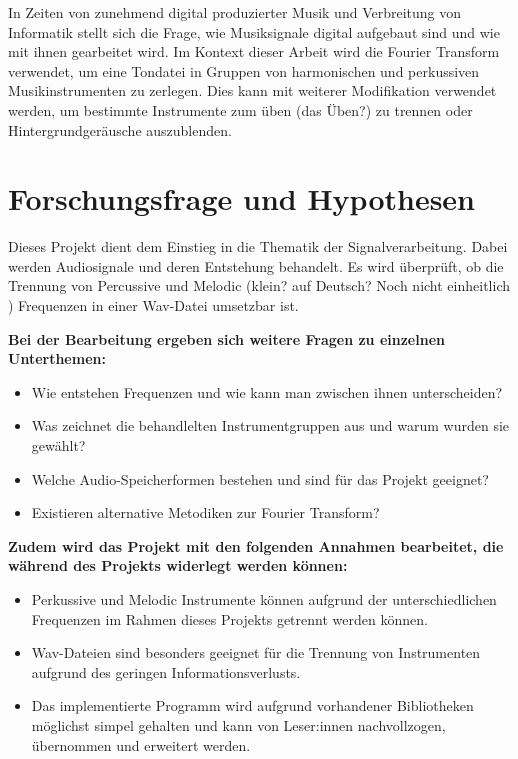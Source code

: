 \par

In Zeiten von zunehmend digital produzierter Musik und Verbreitung von Informatik stellt sich die Frage, wie Musiksignale digital aufgebaut sind und wie mit ihnen gearbeitet wird. Im Kontext dieser Arbeit wird die Fourier Transform verwendet, um eine Tondatei in Gruppen von harmonischen und perkussiven Musikinstrumenten zu zerlegen. Dies kann mit weiterer Modifikation verwendet werden, um bestimmte Instrumente zum üben (das Üben?) zu trennen oder Hintergrundgeräusche auszublenden.


%
\section{Forschungsfrage und Hypothesen}
\label{research-question-and-hypotheses}
%

Dieses Projekt dient dem Einstieg in die Thematik der Signalverarbeitung. Dabei werden Audiosignale und deren Entstehung behandelt.
Es wird überprüft, ob die Trennung von Percussive und Melodic (klein? auf Deutsch? Noch nicht einheitlich ) Frequenzen in einer Wav-Datei umsetzbar ist.

\par

\textbf{Bei der Bearbeitung ergeben sich weitere Fragen zu einzelnen Unterthemen:}

%
\begin{itemize}
    \item Wie entstehen Frequenzen und wie kann man zwischen ihnen unterscheiden?
    \item Was zeichnet die behandlelten Instrumentgruppen aus und warum wurden sie gewählt?
    \item Welche Audio-Speicherformen bestehen und sind für das Projekt geeignet?
    \item Existieren alternative Metodiken zur Fourier Transform? 
\end{itemize}
%

\textbf{Zudem wird das Projekt mit den folgenden Annahmen bearbeitet, die während des Projekts widerlegt werden können:}

%
\begin{itemize}
    \item Perkussive und Melodic Instrumente können aufgrund der unterschiedlichen Frequenzen im Rahmen dieses Projekts getrennt werden können.
    \item Wav-Dateien sind besonders geeignet für die Trennung von Instrumenten aufgrund des geringen Informationsverlusts.
    \item Das implementierte Programm wird aufgrund vorhandener Bibliotheken möglichst simpel gehalten und kann von Leser:innen nachvollzogen, übernommen und erweitert werden.
\end{itemize}
%

